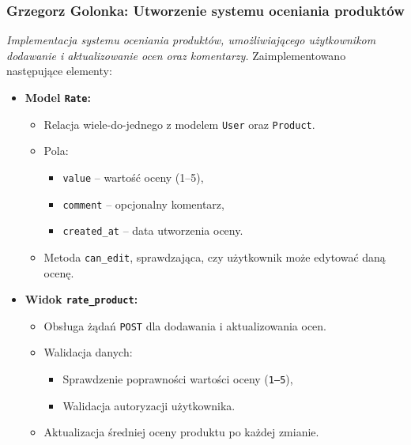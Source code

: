\documentclass[12pt,a4paper,oneside]{article}
\theoremstyle{definition}
\numberwithin{equation}{section}
\begin{document}
\subsubsection{Grzegorz Golonka: Utworzenie systemu oceniania produktów}
\label{section:1.3.34}
\textit{
Implementacja systemu oceniania produktów, umożliwiającego użytkownikom dodawanie i aktualizowanie ocen oraz komentarzy.
}
Zaimplementowano następujące elementy:
\begin{itemize}
    \item \textbf{Model \texttt{Rate}:}
    \begin{itemize}
        \item Relacja wiele-do-jednego z modelem \texttt{User} oraz \texttt{Product}.
        \item Pola:
        \begin{itemize}
            \item \texttt{value} – wartość oceny (1–5),
            \item \texttt{comment} – opcjonalny komentarz,
            \item \texttt{created\_at} – data utworzenia oceny.
        \end{itemize}
        \item Metoda \texttt{can\_edit}, sprawdzająca, czy użytkownik może edytować daną ocenę.
    \end{itemize}
    \item \textbf{Widok \texttt{rate\_product}:}
    \begin{itemize}
        \item Obsługa żądań \texttt{POST} dla dodawania i aktualizowania ocen.
        \item Walidacja danych:
        \begin{itemize}
            \item Sprawdzenie poprawności wartości oceny (\texttt{1–5}),
            \item Walidacja autoryzacji użytkownika.
        \end{itemize}
        \item Aktualizacja średniej oceny produktu po każdej zmianie.
    \end{itemize}
\end{itemize}
%
%
\end{document}
